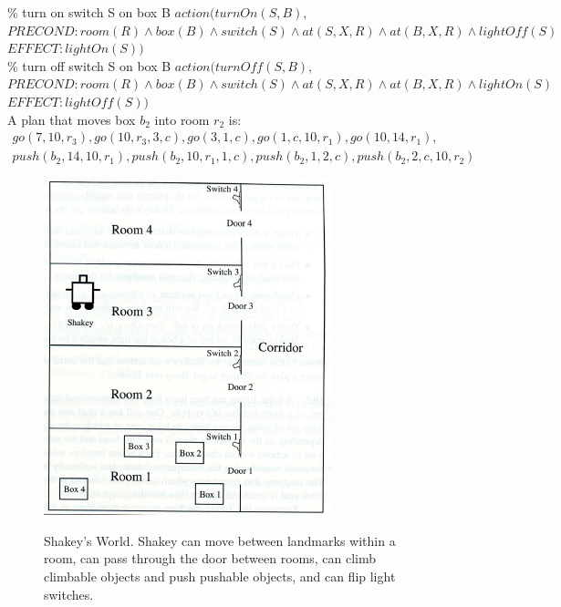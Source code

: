 \documentclass{article}%
\begin{document}
\begin{enumerate}
	\% turn on switch S on box B
	$action( turnOn(S,B), $ \\
	$PRECOND: room(R) \wedge box(B) \wedge switch(S) \wedge at(S,X,R) \wedge at(B,X,R) \wedge lightOff(S) $\\
	$EFFECT: lightOn(S)) $\\
	
	\% turn off switch S on box B
	$action( turnOff(S,B), $ \\
	$PRECOND: room(R) \wedge box(B) \wedge switch(S) \wedge at(S,X,R) \wedge at(B,X,R) \wedge lightOn(S) $\\
	$EFFECT: lightOff(S)) $\\
	
	A plan that moves box $b_2$ into room $r_2$ is: \\
	\begin{multline*}
	go(7,10,r_3), go(10,r_3,3,c), go(3,1,c),go(1,c,10,r_1),go(10,14,r_1),\\
	push(b_2,14,10,r_1),push(b_2,10,r_1,1,c),push(b_2,1,2,c),push(b_2,2,c,10,r_2)
	\end{multline*}
	
	 
	 
\begin{figure}[h]
\begin{center}
  \includegraphics[scale=0.5]{shakey.png}
  \label{fig:shakey}
  \caption{Shakey's World. Shakey can move between landmarks within a room, can pass through the door between rooms, can climb climbable objects and push pushable objects, and can flip light switches.}
\end{center}
\end{figure} 
\end{enumerate}
\end{document}

